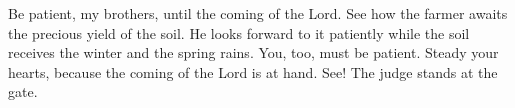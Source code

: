 
\lettrine{B}{}e patient, my brothers, until the coming of the Lord. See how the farmer awaits the precious yield of the soil. He looks forward to it patiently while the soil receives the winter and the spring rains. You, too, must be patient. Steady your hearts, because the coming of the Lord is at hand. See! The judge stands at the gate.